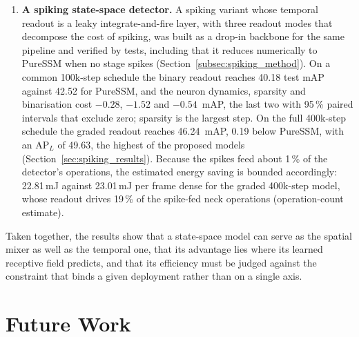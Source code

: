\documentclass[11pt, a4paper]{report}
\begin{document}
\begin{enumerate}
        (Section~\ref{sec:efficiency}).
  \item \textbf{A spiking state-space detector.} A spiking variant whose temporal readout is a
        leaky integrate-and-fire layer, with three readout modes that decompose the cost of spiking, was
        built as a drop-in backbone for the same pipeline and verified by tests, including that it reduces
        numerically to PureSSM when no stage spikes (Section~\ref{subsec:spiking_method}). On a common
        100k-step schedule the binary readout reaches 40.18 test mAP against 42.52 for PureSSM, and the
        neuron dynamics, sparsity and binarisation cost $-0.28$, $-1.52$ and $-0.54$~mAP, the last two with
        95\,\% paired intervals that exclude zero; sparsity is the largest step. On the full 400k-step schedule the graded
        readout reaches 46.24~mAP, 0.19 below PureSSM, with an $\mathrm{AP}_L$ of 49.63, the highest of the
        proposed models (Section~\ref{sec:spiking_results}). Because the spikes feed about 1\,\% of the
        detector's operations, the estimated energy saving is bounded accordingly: 22.81\,mJ against
        23.01\,mJ per frame dense for the graded 400k-step model, whose readout drives 19\,\% of the spike-fed
        neck operations (operation-count estimate).
\end{enumerate}

Taken together, the results show that a state-space model can serve as the spatial mixer as well as the
temporal one, that its advantage lies where its learned receptive field predicts, and that its efficiency
must be judged against the constraint that binds a given deployment rather than on a single axis.

\section{Future Work}
\label{sec:future_work}
\end{document}

